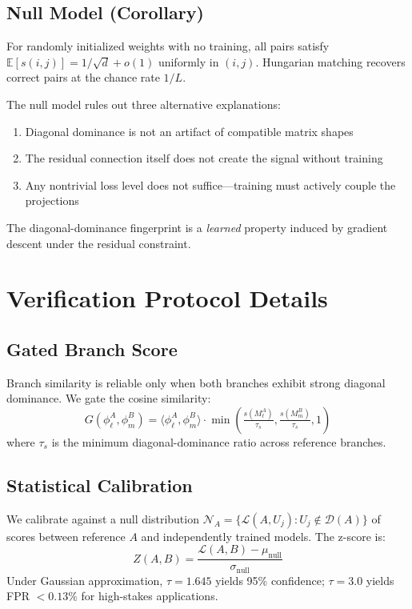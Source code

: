 \subsection{Null Model (Corollary)}

\begin{corollary}
For randomly initialized weights with no training, all pairs satisfy $\mathbb{E}[s(i,j)] = 1/\sqrt{d} + o(1)$ uniformly in $(i,j)$. Hungarian matching recovers correct pairs at the chance rate $1/L$.
\end{corollary}

The null model rules out three alternative explanations:
\begin{enumerate}[nosep]
\item Diagonal dominance is not an artifact of compatible matrix shapes
\item The residual connection itself does not create the signal without training
\item Any nontrivial loss level does not suffice---training must actively couple the projections
\end{enumerate}

The diagonal-dominance fingerprint is a \emph{learned} property induced by gradient descent under the residual constraint.

\section{Verification Protocol Details}\label{app:verification}

\subsection{Gated Branch Score}

Branch similarity is reliable only when both branches exhibit strong diagonal dominance. We gate the cosine similarity:
\begin{equation}
G(\phi^A_\ell, \phi^B_m) = \langle \phi^A_\ell, \phi^B_m \rangle \cdot \min\!\left(\tfrac{s(M^A_\ell)}{\tau_s}, \tfrac{s(M^B_m)}{\tau_s}, 1\right)
\end{equation}
where $\tau_s$ is the minimum diagonal-dominance ratio across reference branches.

\subsection{Statistical Calibration}

We calibrate against a null distribution $\mathcal{N}_A = \{\mathcal{L}(A, U_j) : U_j \notin \mathcal{D}(A)\}$ of scores between reference $A$ and independently trained models. The z-score is:
\begin{equation}
Z(A,B) = \frac{\mathcal{L}(A,B) - \mu_{\mathrm{null}}}{\sigma_{\mathrm{null}}}
\end{equation}
Under Gaussian approximation, $\tau = 1.645$ yields 95\% confidence; $\tau = 3.0$ yields FPR $< 0.13\%$ for high-stakes applications.

